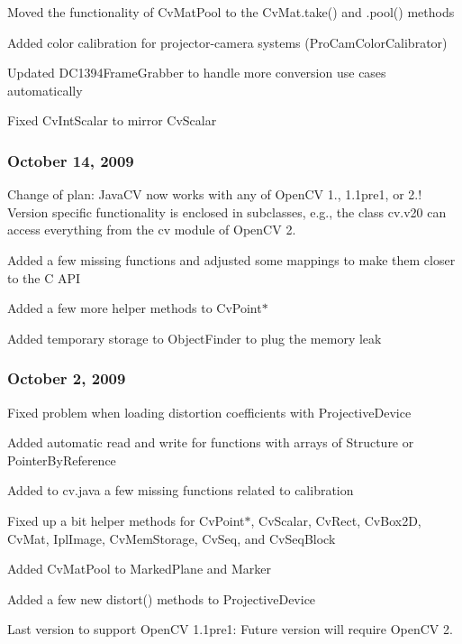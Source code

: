 \begin{DoxyItemize}
\item Moved the functionality of {\ttfamily Cv\+Mat\+Pool} to the {\ttfamily Cv\+Mat.\+take()} and {\ttfamily .pool()} methods
\item Added color calibration for projector-\/camera systems ({\ttfamily Pro\+Cam\+Color\+Calibrator})
\item Updated {\ttfamily D\+C1394\+Frame\+Grabber} to handle more conversion use cases automatically
\item Fixed {\ttfamily Cv\+Int\+Scalar} to mirror {\ttfamily Cv\+Scalar}
\end{DoxyItemize}

\subsubsection*{October 14, 2009}


\begin{DoxyItemize}
\item Change of plan\+: Java\+C\+V now works with any of Open\+C\+V 1., 1.\+1pre1, or 2.! Version specific functionality is enclosed in subclasses, e.\+g., the class {\ttfamily cv.\+v20} can access everything from the {\ttfamily cv} module of Open\+C\+V 2.
\item Added a few missing functions and adjusted some mappings to make them closer to the C A\+P\+I
\item Added a few more helper methods to {\ttfamily Cv\+Point$\ast$}
\item Added temporary storage to {\ttfamily Object\+Finder} to plug the memory leak
\end{DoxyItemize}

\subsubsection*{October 2, 2009}


\begin{DoxyItemize}
\item Fixed problem when loading distortion coefficients with {\ttfamily Projective\+Device}
\item Added automatic read and write for functions with arrays of {\ttfamily Structure} or {\ttfamily Pointer\+By\+Reference}
\item Added to {\ttfamily cv.\+java} a few missing functions related to calibration
\item Fixed up a bit helper methods for {\ttfamily Cv\+Point$\ast$}, {\ttfamily Cv\+Scalar}, {\ttfamily Cv\+Rect}, {\ttfamily Cv\+Box2\+D}, {\ttfamily Cv\+Mat}, {\ttfamily Ipl\+Image}, {\ttfamily Cv\+Mem\+Storage}, {\ttfamily Cv\+Seq}, and {\ttfamily Cv\+Seq\+Block}
\item Added {\ttfamily Cv\+Mat\+Pool} to {\ttfamily Marked\+Plane} and {\ttfamily Marker}
\item Added a few new {\ttfamily distort()} methods to {\ttfamily Projective\+Device}
\item Last version to support Open\+C\+V 1.\+1pre1\+: Future version will require Open\+C\+V 2.
\end{DoxyItemize}

